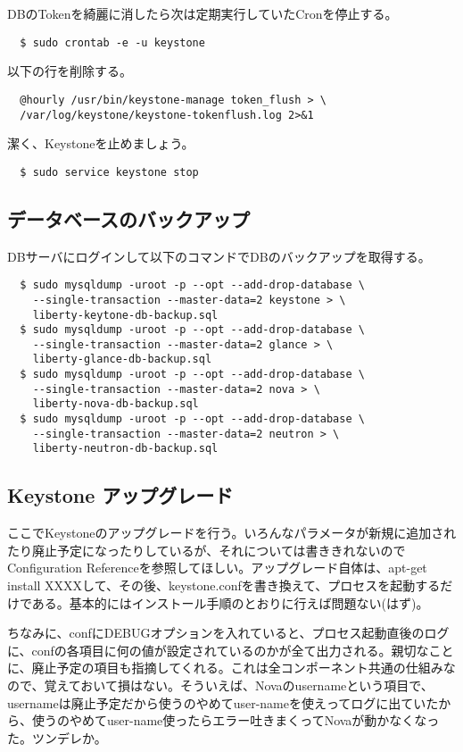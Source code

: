 \documentclass[9pt,b5paper,tombo,openany]{jsbook}
\begin{document}
\noindent
DBのTokenを綺麗に消したら次は定期実行していたCronを停止する。

\begin{lstlisting}
  $ sudo crontab -e -u keystone
\end{lstlisting}

\noindent
以下の行を削除する。

\begin{lstlisting}
  @hourly /usr/bin/keystone-manage token_flush > \
  /var/log/keystone/keystone-tokenflush.log 2>&1
\end{lstlisting}

\noindent
潔く、Keystoneを止めましょう。

\begin{lstlisting}
  $ sudo service keystone stop
\end{lstlisting}

\subsection{データベースのバックアップ}
\noindent
DBサーバにログインして以下のコマンドでDBのバックアップを取得する。

\begin{lstlisting}
  $ sudo mysqldump -uroot -p --opt --add-drop-database \
    --single-transaction --master-data=2 keystone > \
    liberty-keytone-db-backup.sql
  $ sudo mysqldump -uroot -p --opt --add-drop-database \
    --single-transaction --master-data=2 glance > \
    liberty-glance-db-backup.sql
  $ sudo mysqldump -uroot -p --opt --add-drop-database \
    --single-transaction --master-data=2 nova > \
    liberty-nova-db-backup.sql
  $ sudo mysqldump -uroot -p --opt --add-drop-database \
    --single-transaction --master-data=2 neutron > \
    liberty-neutron-db-backup.sql
\end{lstlisting}

\subsection{Keystone アップグレード}
ここでKeystoneのアップグレードを行う。いろんなパラメータが新規に追加されたり廃止予定になったりしているが、それについては書ききれないのでConfiguration Referenceを参照してほしい。アップグレード自体は、apt-get install XXXXして、その後、keystone.confを書き換えて、プロセスを起動するだけである。基本的にはインストール手順のとおりに行えば問題ない(はず)。

ちなみに、confにDEBUGオプションを入れていると、プロセス起動直後のログに、confの各項目に何の値が設定されているのかが全て出力される。親切なことに、廃止予定の項目も指摘してくれる。これは全コンポーネント共通の仕組みなので、覚えておいて損はない。そういえば、Novaのusernameという項目で、usernameは廃止予定だから使うのやめてuser-nameを使えってログに出ていたから、使うのやめてuser-name使ったらエラー吐きまくってNovaが動かなくなった。ツンデレか。\\[1ex]
\end{document}

